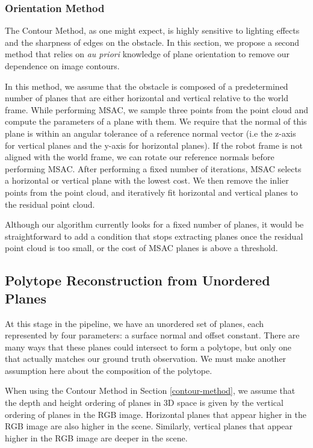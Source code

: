 \subsubsection{Orientation Method} \label{orient-method}

The Contour Method, as one might expect, is highly sensitive to lighting effects and the sharpness of edges on the obstacle. In this section, we propose a second method that relies on \textit{au priori} knowledge of plane orientation to remove our dependence on image contours.

In this method, we assume that the obstacle is composed of a predetermined number of planes that are either horizontal and vertical relative to the world frame. While performing MSAC, we sample three points from the point cloud and compute the parameters of a plane with them. We require that the normal of this plane is within an angular tolerance of a reference normal vector (i.e the z-axis for vertical planes and the y-axis for horizontal planes). If the robot frame is not aligned with the world frame, we can rotate our reference normals before performing MSAC. After performing a fixed number of iterations, MSAC selects a horizontal or vertical plane with the lowest cost. We then remove the inlier points from the point cloud, and iteratively fit horizontal and vertical planes to the residual point cloud.

Although our algorithm currently looks for a fixed number of planes, it would be straightforward to add a condition that stops extracting planes once the residual point cloud is too small, or the cost of MSAC planes is above a threshold.

\subsection{Polytope Reconstruction from Unordered Planes} \label{polytope-section}

At this stage in the pipeline, we have an unordered set of planes, each represented by four parameters: a surface normal and offset constant. There are many ways that these planes could intersect to form a polytope, but only one that actually matches our ground truth observation. We must make another assumption here about the composition of the polytope.

When using the Contour Method in Section \ref{contour-method}, we assume that the depth and height ordering of planes in 3D space is given by the vertical ordering of planes in the RGB image. Horizontal planes that appear higher in the RGB image are also higher in the scene. Similarly, vertical planes that appear higher in the RGB image are deeper in the scene.

